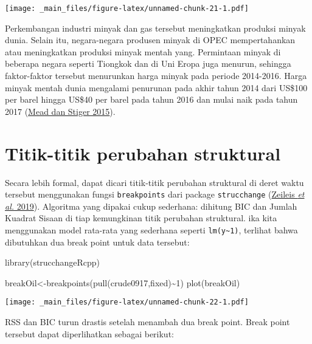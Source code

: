 \documentclass[
]{book}
\newenvironment{Shaded}{\begin{snugshade}}{\end{snugshade}}
\newcommand{\AttributeTok}[1]{\textcolor[rgb]{0.77,0.63,0.00}{#1}}
\newcommand{\DecValTok}[1]{\textcolor[rgb]{0.00,0.00,0.81}{#1}}
\newcommand{\FunctionTok}[1]{\textcolor[rgb]{0.00,0.00,0.00}{#1}}
\newcommand{\NormalTok}[1]{#1}
\newcommand{\OtherTok}[1]{\textcolor[rgb]{0.56,0.35,0.01}{#1}}
\newcommand{\SpecialCharTok}[1]{\textcolor[rgb]{0.00,0.00,0.00}{#1}}
\begin{document}
\texttt{[image: \_main\_files/figure-latex/unnamed-chunk-21-1.pdf]}

Perkembangan industri minyak dan gas tersebut meningkatkan produksi minyak dunia. Selain itu, negara-negara produsen minyak di OPEC mempertahankan atau meningkatkan produksi minyak mentah yang. Permintaan minyak di beberapa negara seperti Tiongkok dan di Uni Eropa juga menurun, sehingga faktor-faktor tersebut menurunkan harga minyak pada periode 2014-2016. Harga minyak mentah dunia mengalami penurunan pada akhir tahun 2014 dari US\$100 per barel hingga US\$40 per barel pada tahun 2016 dan mulai naik pada tahun 2017 (\protect\hyperlink{ref-mead_2014_2015}{Mead dan Stiger 2015}).

\hypertarget{titik-titik-perubahan-struktural}{%
\section{Titik-titik perubahan struktural}\label{titik-titik-perubahan-struktural}}

Secara lebih formal, dapat dicari titik-titik perubahan struktural di deret waktu tersebut menggunakan fungsi \texttt{breakpoints} dari package \texttt{strucchange} (\protect\hyperlink{ref-R-strucchange}{Zeileis \emph{et al.} 2019}). Algoritma yang dipakai cukup sederhana: dihitung BIC dan Jumlah Kuadrat Sisaan di tiap kemungkinan titik perubahan struktural. ika kita menggunakan model rata-rata yang sederhana seperti \texttt{lm(y\textasciitilde{}1)}, terlihat bahwa dibutuhkan dua break point untuk data tersebut:

\begin{Shaded}
\begin{Highlighting}[]
\FunctionTok{library}\NormalTok{(strucchangeRcpp)}

\NormalTok{breakOil}\OtherTok{\textless{}{-}}\FunctionTok{breakpoints}\NormalTok{(}\FunctionTok{pull}\NormalTok{(crude0917,fixed)}\SpecialCharTok{\textasciitilde{}}\DecValTok{1}\NormalTok{)}
\FunctionTok{plot}\NormalTok{(breakOil)}
\end{Highlighting}
\end{Shaded}

\texttt{[image: \_main\_files/figure-latex/unnamed-chunk-22-1.pdf]}

RSS dan BIC turun drastis setelah menambah dua break point. Break point tersebut dapat diperlihatkan sebagai berikut:

\begin{Shaded}
\end{Shaded}
\end{document}
